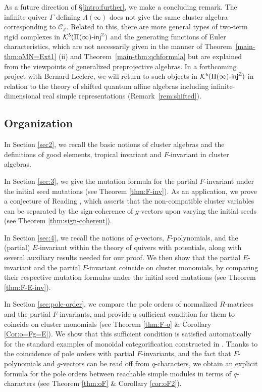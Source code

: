 \documentclass[12pt]{amsart}
\theoremstyle{definition}
\theoremstyle{remark}
\numberwithin{equation}{section}
\newcommand{\injc}{\mathchar`-\mathsf{inj}}
\begin{document}
    As a future direction of \S \ref{intro:further}, we make a concluding remark.
    The infinite quiver $\Gamma$ defining $\Lambda(\infty)$ does not give the same cluster algebra corresponding to $\mathcal{C}_\mathbb{Z}$.
    Related to this, there are more general types of two-term rigid complexes in $\mathcal{K}^b(\Pi(\infty)\injc^\mathbb{Z})$ and the generating functions of Euler characteristics, which are not necessarily given in the manner of Theorem~\ref{main-thm:oMN=Ext1} (ii) and Theorem~\ref{main-thm:qchformula} but are explained from the viewpoints of generalized preprojective algebras.
    In a forthcoming project with Bernard Leclerc, we will return to such objects in $\mathcal{K}^b(\Pi(\infty)\injc^\mathbb{Z})$ in relation to the theory of shifted quantum affine algebras including infinite-dimensional real simple representations (Remark~\ref{rem:shifted}).


\subsection*{Organization}
In Section \ref{sec2}, we recall the basic notions of cluster algebras and the definitions of good elements, tropical invariant and $F$-invariant in cluster algebras.

In Section \ref{sec:3}, we give the mutation formula for the partial $F$-invariant under the initial seed mutations (see Theorem \ref{thm:F-inv}). As an application, we prove a conjecture of Reading \cite[Conjecture 8.21]{Reading-2014}, which asserts that the non-compatible cluster variables can be separated by the sign-coherence of $g$-vectors upon varying the initial seeds (see Theorem \ref{thm:sign-coherent}).

In Section \ref{sec:4},  we recall the notions of $g$-vectors, $F$-polynomials, and the (partial) $E$-invariant within the theory of quivers with potentials, along with several auxiliary results needed for our proof. We then show that the partial $E$-invariant and the partial $F$-invariant coincide on cluster monomials, by comparing their respective mutation formulas under the initial seed mutations (see Theorem \ref{thm:F-E-inv}).

In Section \ref{sec:pole-order}, we compare the pole orders of normalized $R$-matrices and the partial $F$-invariants, and provide a sufficient condition for them to coincide on cluster monomials (see Theorem \ref{thm:F-o} \& Corollary \ref{Cor:o=Fg=E}). We show that this sufficient condition is satisfied automatically for the standard examples of monoidal categorification constructed in \cite{kkop-2024}. Thanks to the coincidence of pole orders with partial $F$-invariants, and the fact that $F$-polynomials and $g$-vectors can be read off from $q$-characters, we obtain an explicit formula for the pole orders between reachable simple modules in terms of $q$-characters (see Theorem \ref{thm:oF} \& Corollary \ref{cor:oF2}).
\end{document}
